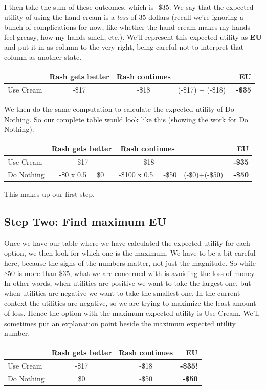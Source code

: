\documentclass[]{tufte-book}
\begin{document}
I then take the sum of these outcomes, which is -\$35. We say that the expected utility of using the hand cream is a \emph{loss} of 35 dollars (recall we're ignoring a bunch of complications for now, like whether the hand cream makes my hands feel greasy, how my hands smell, etc.). We'll represent this expected utility as \textbf{EU} and put it in as column to the very right, being careful not to interpret that column as another state.

\begin{longtable}[]{@{}lccr@{}}
\toprule
& Rash gets better & Rash continues & EU\tabularnewline
\midrule
\endhead
Use Cream & -\$17 & -\$18 & (-\$17) + (-\$18) = \textbf{-\$35}\tabularnewline
\bottomrule
\end{longtable}

We then do the same computation to calculate the expected utility of Do Nothing. So our complete table would look like this (showing the work for Do Nothing):

\begin{longtable}[]{@{}lccr@{}}
\toprule
& Rash gets better & Rash continues & EU\tabularnewline
\midrule
\endhead
Use Cream & -\$17 & -\$18 & \textbf{-\$35}\tabularnewline
Do Nothing & -\$0 x 0.5 = \$0 & -\$100 x 0.5 = -\$50 & (-\$0)+(-\$50) = \textbf{-\$50}\tabularnewline
\bottomrule
\end{longtable}

This makes up our first step.

\hypertarget{step-two-find-maximum-eu}{%
\subsection{Step Two: Find maximum EU}\label{step-two-find-maximum-eu}}

Once we have our table where we have calculated the expected utility for each option, we then look for which one is the maximum. We have to be a bit careful here, because the signs of the numbers matter, not just the magnitude. So while \$50 is more than \$35, what we are concerned with is avoiding the loss of money. In other words, when utilities are positive we want to take the largest one, but when utilities are negative we want to take the smallest one. In the current context the utilities are negative, so we are trying to maximize the least amount of loss. Hence the option with the maximum expected utility is Use Cream. We'll sometimes put an explanation point beside the maximum expected utility number.

\begin{longtable}[]{@{}lccr@{}}
\toprule
& Rash gets better & Rash continues & EU\tabularnewline
\midrule
\endhead
Use Cream & -\$17 & -\$18 & \textbf{-\$35!}\tabularnewline
Do Nothing & \$0 & -\$50 & \textbf{-\$50}\tabularnewline
\bottomrule
\end{longtable}
\end{document}
